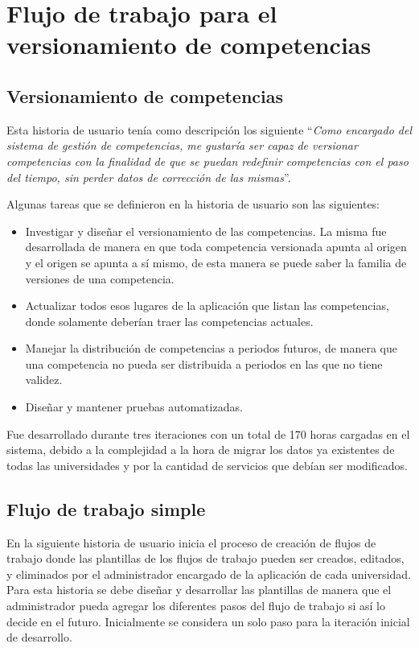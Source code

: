 \section{Flujo de trabajo para el versionamiento de competencias}
\subsection{Versionamiento de competencias}
Esta historia de usuario tenía como descripción los siguiente \enquote{\textit{Como encargado del sistema de gestión de competencias, me gustaría ser capaz de versionar competencias con la finalidad de que se puedan redefinir competencias con el paso del tiempo, sin perder datos de corrección de las mismas}}.

Algunas tareas que se definieron en la historia de usuario son las siguientes:
\begin{itemize}
	\item Investigar y diseñar el versionamiento de las competencias. La misma fue desarrollada de manera en que toda competencia versionada apunta al origen y el origen se apunta a sí mismo, de esta manera se puede saber la familia de versiones de una competencia.
	\item Actualizar todos esos lugares de la aplicación que listan las competencias, donde solamente deberían traer las competencias actuales.
	\item Manejar la distribución de competencias a periodos futuros, de manera que una competencia no pueda ser distribuida a periodos en las que no tiene validez.
	\item Diseñar y mantener pruebas automatizadas.
\end{itemize}

Fue desarrollado durante tres iteraciones con un total de 170 horas cargadas en el sistema, debido a la complejidad a la hora de migrar los datos ya existentes de todas las universidades y por la cantidad de servicios que debían ser modificados.

\subsection{Flujo de trabajo simple}
En la siguiente historia de usuario inicia el proceso de creación de flujos de trabajo donde las plantillas de los flujos de trabajo pueden ser creados, editados, y eliminados por el administrador encargado de la aplicación de cada universidad. Para esta historia se debe diseñar y desarrollar las plantillas de manera que el administrador pueda agregar los diferentes pasos del flujo de trabajo si así lo decide en el futuro. Inicialmente se considera un solo paso para la iteración inicial de desarrollo.


